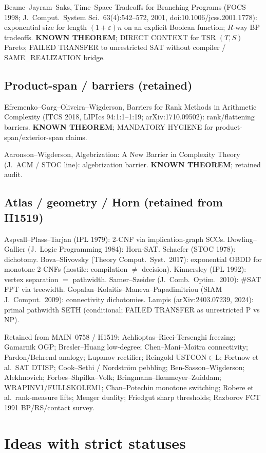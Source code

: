 \documentclass[11pt]{article}
\begin{document}
Beame--Jayram--Saks, Time--Space Tradeoffs for Branching Programs
(FOCS 1998; J.\ Comput.\ System Sci.\ 63(4):542--572, 2001, doi:10.1006/jcss.2001.1778):
exponential size for length $(1+\varepsilon)n$ on an explicit Boolean function; $R$-way BP tradeoffs.
\textbf{KNOWN THEOREM}; DIRECT CONTEXT for TSR $(T,S)$ Pareto; FAILED TRANSFER to
unrestricted SAT without compiler / SAME\_REALIZATION bridge.

\subsection*{Product-span / barriers (retained)}
Efremenko--Garg--Oliveira--Wigderson, Barriers for Rank Methods in Arithmetic Complexity
(ITCS 2018, LIPIcs 94:1:1--1:19; arXiv:1710.09502): rank/flattening barriers.
\textbf{KNOWN THEOREM}; MANDATORY HYGIENE for product-span/exterior-span claims.

Aaronson--Wigderson, Algebrization: A New Barrier in Complexity Theory
(J.\ ACM / STOC line): algebrization barrier. \textbf{KNOWN THEOREM}; retained audit.

\subsection*{Atlas / geometry / Horn (retained from H1519)}
Aspvall--Plass--Tarjan (IPL 1979): 2-CNF via implication-graph SCCs.
Dowling--Gallier (J.\ Logic Programming 1984): Horn-SAT.
Schaefer (STOC 1978): dichotomy.
Bova--Slivovsky (Theory Comput.\ Syst.\ 2017): exponential OBDD for monotone 2-CNFs
(hostile: compilation $\neq$ decision).
Kinnersley (IPL 1992): vertex separation $=$ pathwidth.
Samer--Szeider (J.\ Comb.\ Optim.\ 2010): \#SAT FPT via treewidth.
Gopalan--Kolaitis--Maneva--Papadimitriou (SIAM J.\ Comput.\ 2009): connectivity dichotomies.
Lampis (arXiv:2403.07239, 2024): primal pathwidth SETH (conditional; FAILED TRANSFER
as unrestricted P vs NP).

Retained from MAIN~0758 / H1519: Achlioptas--Ricci-Tersenghi freezing; Gamarnik OGP;
Bresler--Huang low-degree; Chen--Mani--Moitra connectivity; Pardon/Behrend analogy;
Lupanov rectifier; Reingold USTCON$\in$L; Fortnow et al.\ SAT DTISP; Cook--Sethi /
Nordstr\"om pebbling; Ben-Sasson--Wigderson; Alekhnovich; Forbes--Shpilka--Volk;
Bringmann--Ikenmeyer--Zuiddam; WRAPINV1/FULLSKOLEM1; Chan--Potechin monotone switching;
Robere et al.\ rank-measure lifts; Menger duality; Friedgut sharp thresholds;
Razborov FCT 1991 BP/RS/contact survey.

\section*{Ideas with strict statuses}
\end{document}
